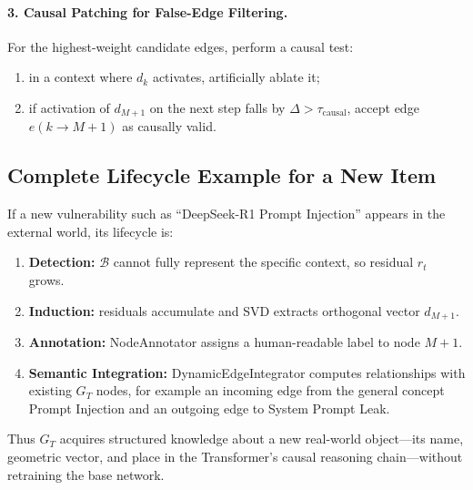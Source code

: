 \documentclass[11pt,a4paper]{article}
\begin{document}
\paragraph{3. Causal Patching for False-Edge Filtering.}
For the highest-weight candidate edges, perform a causal test:
\begin{enumerate}
\item in a context where $d_k$ activates, artificially ablate it;
\item if activation of $d_{M+1}$ on the next step falls by $\Delta>\tau_{\text{causal}}$, accept edge $e(k\rightarrow M+1)$ as causally valid.
\end{enumerate}

\subsection*{Complete Lifecycle Example for a New Item}
If a new vulnerability such as ``DeepSeek-R1 Prompt Injection'' appears in the external world, its lifecycle is:
\begin{enumerate}
\item \textbf{Detection:} $\mathcal B$ cannot fully represent the specific context, so residual $r_t$ grows.
\item \textbf{Induction:} residuals accumulate and SVD extracts orthogonal vector $d_{M+1}$.
\item \textbf{Annotation:} NodeAnnotator assigns a human-readable label to node $M+1$.
\item \textbf{Semantic Integration:} DynamicEdgeIntegrator computes relationships with existing $G_T$ nodes, for example an incoming edge from the general concept Prompt Injection and an outgoing edge to System Prompt Leak.
\end{enumerate}
Thus $G_T$ acquires structured knowledge about a new real-world object---its name, geometric vector, and place in the Transformer's causal reasoning chain---without retraining the base network.
\end{document}
